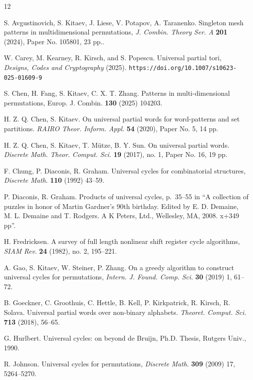 \documentclass[12pt]{article}
\begin{document}
\begin{thebibliography}{12}

 S. Avgustinovich, S. Kitaev, J. Liese, V. Potapov, A. Taranenko. Singleton mesh patterns in multidimensional permutations, {\em J. Combin. Theory Ser. A} {\bf 201} (2024), Paper No. 105801, 23 pp..

 W. Carey, M. Kearney, R. Kirsch, and S. Popescu. Universal partial tori, {\em Designs, Codes and Cryptography} (2025). \verb>https://doi.org/10.1007/s10623-025-01609-9>

 S. Chen, H. Fang, S. Kitaev, C. X. T. Zhang. Patterns in multi-dimensional permutations, {Europ. J. Combin.} {\bf 130} (2025) 104203.

 H. Z. Q. Chen, S. Kitaev. On universal partial words for word-patterns and set partitions. {\em RAIRO Theor. Inform. Appl.} {\bf 54} (2020), Paper No. 5, 14 pp.

 H. Z. Q. Chen, S. Kitaev, T. M\"{u}tze, B. Y. Sun. On universal partial words. {\em Discrete Math. Theor. Comput. Sci.} {\bf 19} (2017), no. 1, Paper No. 16, 19 pp. 

 F. Chung, P. Diaconis, R. Graham. Universal cycles for combinatorial structures, {\em Discrete Math.} {\bf 110} (1992) 43--59.

 P. Diaconis, R. Graham. Products of universal cycles, p.\ 35--55 in ``A collection of puzzles in honor of Martin Gardner's 90th birthday. Edited by E. D. Demaine, M. L. Demaine and T. Rodgers. A K Peters, Ltd., Wellesley, MA, 2008. x+349 pp''. 

 H. Fredricksen. A survey of full length nonlinear shift register cycle algorithms, {\em SIAM Rev.} {\bf 24} (1982), no. 2, 195--221.

 A. Gao, S. Kitaev, W. Steiner, P. Zhang. On a greedy algorithm to construct universal cycles for permutations, {\em Intern. J. Found. Comp. Sci.} {\bf 30} (2019) 1, 61--72.

 B. Goeckner, C. Groothuis, C. Hettle, B. Kell, P. Kirkpatrick, R. Kirsch, R. Solava. Universal partial words over non-binary alphabets. {\em Theoret. Comput. Sci.} {\bf 713} (2018), 56--65.

 G. Hurlbert.  Universal cycles: on beyond de Bruijn, Ph.D. Thesis, Rutgers Univ., 1990.

 R. Johnson. Universal cycles for permutations, {\em Discrete Math.} {\bf 309} (2009) 17, 5264--5270.


\end{thebibliography}
\end{document}
